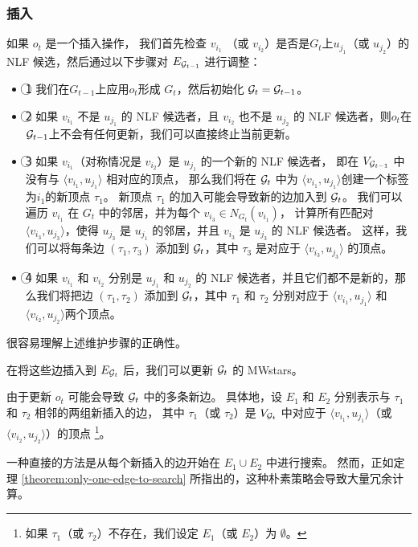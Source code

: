 \subsubsection{插入}
如果 $o_t$ 是一个插入操作，
我们首先检查 $v_{i_1}$ （或 $v_{i_2}$）是否是$G_t$上$u_{j_1}$（或 $u_{j_2}$）的 NLF 候选，然后通过以下步骤对 $E_{\mathcal{G}_{t-1}}$ 进行调整：
\begin{itemize}
\item \textcircled{1} 我们在$G_{t-1}$上应用$o_t$形成 $G_t$，然后初始化 $\mathcal{G}_t = \mathcal{G}_{t-1}$。
\item \textcircled{2} 如果 $v_{i_1}$ 不是 $u_{j_1}$ 的 NLF 候选者，且 $v_{i_2}$ 也不是 $u_{j_2}$ 的 NLF 候选者，则$o_t$在$\mathcal{G}_{t-1}$上不会有任何更新，我们可以直接终止当前更新。
\item \textcircled{3} 如果 $v_{i_1}$（对称情况是 $v_{i_2}$）是 $u_{j_1}$ 的一个新的 NLF 候选者，
即在 $V_{\mathcal{G}_{t-1}}$ 中没有与 $\langle v_{i_1}, u_{j_1} \rangle$ 相对应的顶点，
那么我们将在 $\mathcal{G}_t$ 中为 $\langle v_{i_1}, u_{j_1} \rangle$创建一个标签为$i_1$的新顶点 $\tau_1$。
新顶点 $\tau_1$ 的加入可能会导致新的边加入到 $\mathcal{G}_t$。
我们可以遍历 $v_{i_1}$ 在 $G_t$ 中的邻居，并为每个 $v_{i_3}\in N_{G_t}(v_{i_1})$，
计算所有匹配对 $\langle v_{i_3}, u_{j_3} \rangle$，使得 $u_{j_3}$ 是 $u_{j_1}$ 的邻居，并且 $v_{i_3}$ 是 $u_{j_3}$ 的 NLF 候选者。
这样，我们可以将每条边 $(\tau_1, \tau_3)$ 添加到 $\mathcal{G}_t$，其中 $\tau_3$ 是对应于 $\langle v_{i_3}, u_{j_3} \rangle$ 的顶点。
\item \textcircled{4} 如果 $v_{i_1}$ 和 $v_{i_2}$ 分别是 $u_{j_1}$ 和 $u_{j_2}$ 的 NLF 候选者，并且它们都不是新的，那么我们将把边 $(\tau_1, \tau_2)$ 添加到 $\mathcal{G}_t$，其中 $\tau_1$ 和 $\tau_2$ 分别对应于 $\langle v_{i_1}, u_{j_1} \rangle$ 和 $\langle v_{i_2}, u_{j_2} \rangle$两个顶点。
\end{itemize}

很容易理解上述维护步骤的正确性。

在将这些边插入到 $E_{\mathcal{G}_t}$ 后，我们可以更新 $\mathcal{G}_t$ 的 MWstars。

由于更新 $o_t$ 可能会导致 $\mathcal{G}_t$ 中的多条新边。
具体地，设 $E_1$ 和 $E_2$ 分别表示与 $\tau_1$ 和 $\tau_2$ 相邻的两组新插入的边，
其中 $\tau_1$（或 $\tau_2$）是 $V_{\mathcal{G}_t}$ 中对应于 $\langle v_{i_1}, u_{j_1} \rangle$（或 $\langle v_{i_2}, u_{j_2} \rangle$）的顶点
\footnote{如果 $\tau_1$（或 $\tau_2$）不存在，我们设定 $E_1$（或 $E_2$）为 $\emptyset$。}。

一种直接的方法是从每个新插入的边开始在 $E_1 \cup E_2$ 中进行搜索。
然而，正如定理 \ref{theorem:only-one-edge-to-search} 所指出的，这种朴素策略会导致大量冗余计算。

